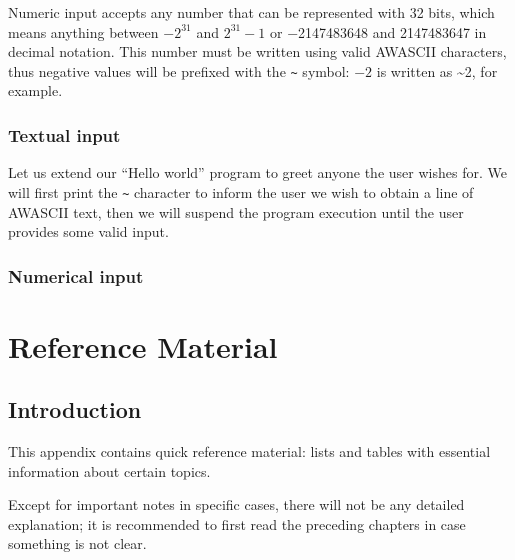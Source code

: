 \documentclass[11pt,a4paper,draft]{book}
\begin{document}
Numeric input accepts any number that can be represented with 32 bits,
which means anything between \(-2^{31}\) and \(2^{31}-1\) or
\num{-2147483648} and \num{2147483647} in decimal notation. This
number must be written using valid AWASCII characters, thus negative
values will be prefixed with the \verb|~| symbol: \(-2\) is written as
\~{}2, for example.

\subsection{Textual input}
Let us extend our \enquote{Hello world} program to greet anyone the
user wishes for. We will first print the \verb|~| character to inform
the user we wish to obtain a line of AWASCII text, then we will
suspend the program execution until the user provides some valid
input.


\subsection{Numerical input}

\appendix
\chapter{Reference Material}
\section{Introduction}
This appendix contains quick reference material: lists and tables with
essential information about certain topics.

Except for important notes in specific cases, there will not be any
detailed explanation; it is recommended to first read the preceding
chapters in case something is not clear.
\end{document}
